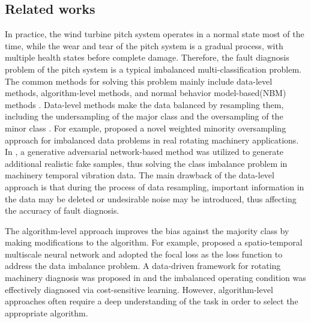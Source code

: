 \documentclass[lettersize,journal]{IEEEtran}
\begin{document}
\subsection{Related works}%
In practice, the wind turbine pitch system operates in a normal state most of the time, while the wear and tear of the pitch system is a gradual process, with multiple health states before complete damage. Therefore, the fault diagnosis problem of the pitch system is a typical imbalanced multi-classification problem. The common methods for solving this problem mainly include data-level methods, algorithm-level methods, and normal behavior model-based(NBM) methods \cite{tanha2020boosting,tautz2017using}. Data-level methods make the data balanced by resampling them, including the undersampling of the major class and the oversampling of the minor class \cite{yang2023fault}. For example, \citet{zhang2018imbalanced} proposed a novel weighted minority oversampling approach for imbalanced data problems in real rotating machinery applications. In \cite{zhang2020machinery}, a generative adversarial network-based method was utilized to generate additional realistic fake samples, thus solving the class imbalance problem in machinery temporal vibration data. The main drawback of the data-level approach is that during the process of data resampling, important information in the data may be deleted or undesirable noise may be introduced, thus affecting the accuracy of fault diagnosis.

The algorithm-level approach improves the bias against the majority class by making modifications to the algorithm. For example, \citet{he2020spatio} proposed a spatio-temporal multiscale neural network and adopted the focal loss as the loss function to address the data imbalance problem. A data-driven framework for rotating machinery diagnosis was proposed in \cite{xu2020imbalanced} and the imbalanced operating condition was effectively diagnosed via cost-sensitive learning. However, algorithm-level approaches often require a deep understanding of the task in order to select the appropriate algorithm.
\end{document}
